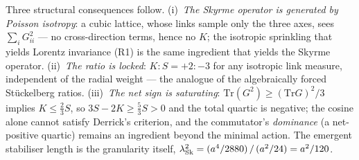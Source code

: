 Three structural consequences follow. (i)~\emph{The Skyrme operator is generated
by Poisson isotropy}: a cubic lattice, whose links sample only the three axes,
sees $\sum_i G_{ii}^2$ --- no cross-direction terms, hence no $K$; the isotropic
sprinkling that yields Lorentz invariance (R1) is the same ingredient that
yields the Skyrme operator. (ii)~\emph{The ratio is locked}: $K\!:\!S=+2:-3$ for
any isotropic link measure, independent of the radial weight --- the analogue of
the algebraically forced St\"uckelberg ratios. (iii)~\emph{The net sign is
saturating}: $\mathrm{Tr}(G^2)\ge(\mathrm{Tr}G)^2/3$ implies $K\le\tfrac23 S$,
so $3S-2K\ge\tfrac53 S>0$ and the total quartic is negative; the cosine alone
cannot satisfy Derrick's criterion, and the commutator's \emph{dominance} (a
net-positive quartic) remains an ingredient beyond the minimal action. The
emergent stabiliser length is the granularity itself,
$\lambda_{\rm Sk}^2 = (a^4/2880)\,/\,(a^2/24) = a^2/120$.
